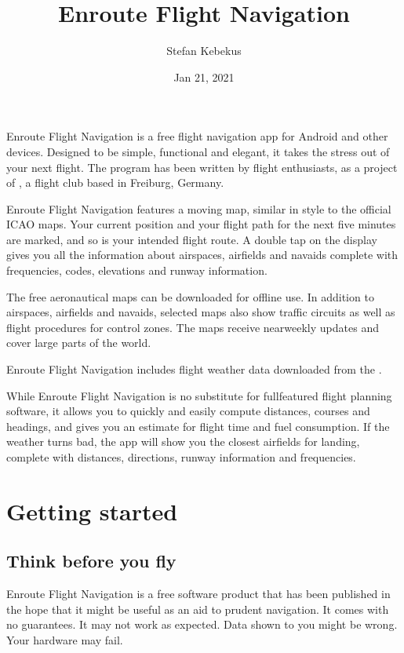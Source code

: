 \documentclass[letterpaper,10pt,english]{sphinxmanual}
\title{Enroute Flight Navigation}
\date{Jan 21, 2021}
\author{Stefan Kebekus}
\let\sphinxpxdimen\pdfpxdimen\else\newdimen\sphinxpxdimen
\begin{document}
\pagestyle{empty}
\sphinxmaketitle
\pagestyle{plain}
\sphinxtableofcontents
\pagestyle{normal}
\label{\detokenize{index::doc}}


\noindent{\hspace*{\fill}\sphinxincludegraphics[width=100\sphinxpxdimen]{{de.akaflieg_freiburg.enroute}.png}\hspace*{\fill}}

Enroute Flight Navigation is a free flight navigation app for Android and other
devices. Designed to be simple, functional and elegant, it takes the stress out
of your next flight. The program has been written by flight enthusiasts, as a
project of , a flight club
based in Freiburg, Germany.

Enroute Flight Navigation features a moving map, similar in style to the
official ICAO maps. Your current position and your flight path for the next five
minutes are marked, and so is your intended flight route. A double tap on the
display gives you all the information about airspaces, airfields and navaids \textendash{}
complete with frequencies, codes, elevations and runway information.

The free aeronautical maps can be downloaded for offline use. In addition to
airspaces, airfields and navaids, selected maps also show traffic circuits as
well as flight procedures for control zones. The maps receive near\sphinxhyphen{}weekly
updates and cover large parts of the world.

Enroute Flight Navigation includes flight weather data downloaded from the
.

While Enroute Flight Navigation is no substitute for full\sphinxhyphen{}featured flight
planning software, it allows you to quickly and easily compute distances,
courses and headings, and gives you an estimate for flight time and fuel
consumption. If the weather turns bad, the app will show you the closest
airfields for landing, complete with distances, directions, runway information
and frequencies.

\part{Getting started}


\chapter{Think before you fly}
\label{\detokenize{01-intro/think:think-before-you-fly}}\label{\detokenize{01-intro/think::doc}}
Enroute Flight Navigation is a free software product that has been published in
the hope that it might be useful as an aid to prudent navigation.  It comes with
no guarantees.  It may not work as expected.  Data shown to you might be wrong.
Your hardware may fail.
\end{document}
